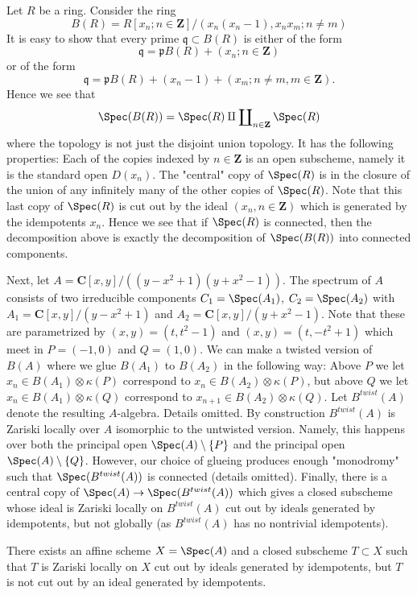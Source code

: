 \noindent
Let $R$ be a ring. Consider the ring
$$
B(R) = R[x_n; n \in \mathbf{Z}]/(x_n(x_n - 1), x_nx_m; n \not = m)
$$
It is easy to show that every prime $\mathfrak q \subset B(R)$
is either of the form
$$
\mathfrak q = \mathfrak pB(R) + (x_n; n \in \mathbf{Z})
$$
or of the form
$$
\mathfrak q =
\mathfrak pB(R) + (x_n - 1) + (x_m; n \not = m, m \in \mathbf{Z}).
$$
Hence we see that
$$
\Spec(B(R)) =
\Spec(R) \amalg \coprod\nolimits_{n \in \mathbf{Z}} \Spec(R)
$$
where the topology is not just the disjoint union topology. It has the
following properties: Each of the copies indexed by $n \in \mathbf{Z}$
is an open subscheme, namely it is the standard open $D(x_n)$.
The "central" copy of $\Spec(R)$ is in the closure of the union
of any infinitely many of the other copies of $\Spec(R)$.
Note that this last copy of $\Spec(R)$ is cut out by the ideal
$(x_n, n \in \mathbf{Z})$ which is generated by the idempotents $x_n$.
Hence we see that if $\Spec(R)$ is connected,
then the decomposition above is exactly the decomposition of
$\Spec(B(R))$ into connected components.

\medskip\noindent
Next, let $A = \mathbf{C}[x, y]/((y - x^2 + 1)(y + x^2 - 1))$.
The spectrum of $A$ consists of two irreducible components
$C_1 = \Spec(A_1)$, $C_2 = \Spec(A_2)$
with $A_1 = \mathbf{C}[x, y]/(y - x^2 + 1)$ and
$A_2 = \mathbf{C}[x, y]/(y + x^2 - 1)$. Note that these are
parametrized by $(x, y) = (t, t^2 - 1)$ and $(x, y) = (t, -t^2 + 1)$
which meet in $P = (-1, 0)$ and $Q = (1, 0)$. We can make a twisted
version of $B(A)$ where we glue $B(A_1)$ to $B(A_2)$ in the following
way: Above $P$ we let $x_n \in B(A_1) \otimes \kappa(P)$
correspond to $x_n \in B(A_2) \otimes \kappa(P)$, but above $Q$
we let $x_n \in B(A_1) \otimes \kappa(Q)$
correspond to $x_{n + 1} \in B(A_2) \otimes \kappa(Q)$.
Let $B^{twist}(A)$ denote the resulting $A$-algebra.
Details omitted. By construction
$B^{twist}(A)$ is Zariski locally over $A$ isomorphic to the untwisted
version. Namely, this happens over both the principal open
$\Spec(A) \setminus \{P\}$
and the principal open $\Spec(A) \setminus \{Q\}$.
However, our choice of glueing produces enough "monodromy" such that
$\Spec(B^{twist}(A))$ is connected (details omitted).
Finally, there is a central copy of
$\Spec(A) \to \Spec(B^{twist}(A))$
which gives a closed subscheme whose ideal is Zariski locally
on $B^{twist}(A)$ cut out by ideals generated by idempotents, but
not globally (as $B^{twist}(A)$ has no nontrivial idempotents).

\begin{lemma}
\label{lemma-not-generated-idempotents}
There exists an affine scheme $X = \Spec(A)$ and a
closed subscheme $T \subset X$ such that $T$ is Zariski locally
on $X$ cut out by ideals generated by idempotents, but
$T$ is not cut out by an ideal generated by idempotents.
\end{lemma}

